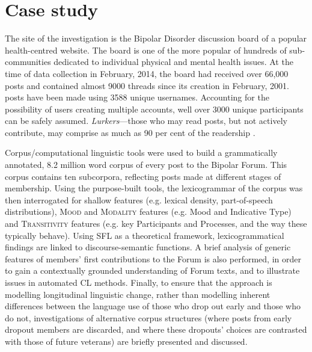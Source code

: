 \documentclass{article}
\renewcommand{\cite}{\parencite}
\begin{document}
\section{Case study}

The site of the investigation is the Bipolar Disorder discussion board of a popular health-centred website. The board is one of the more popular of hundreds of sub-communities dedicated to individual physical and mental health issues. At the time of data collection in February, 2014, the board had received over 66,000 posts and contained almost 9000 threads since its creation in February, 2001. posts have been made using 3588 unique usernames. Accounting for the possibility of users creating multiple accounts, well over 3000 unique participants can be safely assumed. \emph{Lurkers}---those who may read posts, but not actively contribute, may comprise as much as 90 per cent of the readership \cite{preece_top_2004}.

Corpus\slash computational linguistic tools were used to build a grammatically annotated, 8.2 million word corpus of every post to the Bipolar Forum. This corpus contains ten subcorpora, reflecting posts made at different stages of membership. Using the purpose-built tools, the lexicogrammar of the corpus was then interrogated for shallow features (e.g. lexical density, part-of-speech distributions), \textsc{Mood} and \textsc{Modality} features (e.g. Mood and Indicative Type) and \textsc{Transitivity} features (e.g. key Participants and Processes, and the way these typically behave). Using SFL as a theoretical framework, lexicogrammatical findings are linked to discourse-semantic functions. A brief analysis of generic features of members' first contributions to the Forum is also performed, in order to gain a contextually grounded understanding of Forum texts, and to illustrate issues in automated CL methods. Finally, to ensure that the approach is modelling longitudinal linguistic change, rather than modelling inherent differences between the language use of those who drop out early and those who do not, investigations of alternative corpus structures (where posts from early dropout members are discarded, and where these dropouts' choices are contrasted with those of future veterans) are briefly presented and discussed.
\end{document}
